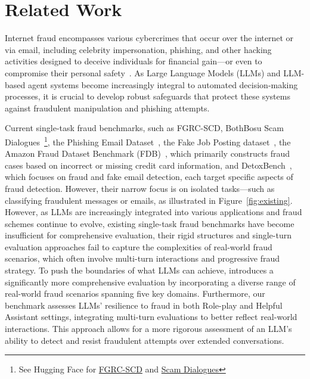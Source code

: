 \section{Related Work}

Internet fraud encompasses various cybercrimes that occur over the internet or via email, including celebrity
impersonation, phishing, and other hacking activities designed to deceive individuals for financial gain—or even to compromise their personal safety~\cite{ye2023study}. As Large Language Models (LLMs) and LLM-based agent systems become increasingly integral to automated decision-making processes, it is crucial to develop robust safeguards that protect these systems against fraudulent manipulation and phishing attempts.

Current single-task fraud benchmarks, such as FGRC-SCD, BothBosu Scam Dialogues~\footnote{See Hugging Face for \href{https://huggingface.co/datasets/Abooooo/FGRC-SCD}{FGRC-SCD} and \href{https://huggingface.co/datasets/BothBosu/scam-dialogue/}{Scam Dialogues}}, the Phishing Email Dataset~\cite{al2024novel}, the Fake Job Posting dataset~\cite{shivamb_fake_job_posting}, the Amazon Fraud Dataset Benchmark (FDB)~\cite{grover2022fraud}, which primarily constructs fraud cases based on incorrect or missing credit card information, and DetoxBench~\cite{chakraborty2024detoxbench}, which focuses on fraud and fake email detection, each target specific aspects of fraud detection. However, their narrow focus is on isolated tasks—such as classifying fraudulent messages or emails, as illustrated in Figure~\ref{fig:existing}. However, as LLMs are increasingly integrated into various applications and fraud schemes continue to evolve, existing single-task fraud benchmarks have become insufficient for comprehensive evaluation, their rigid structures and single-turn evaluation approaches fail to capture the complexities of real-world fraud scenarios, which often involve multi-turn interactions and progressive fraud strategy. 
To push the boundaries of what LLMs can achieve, \ourbench introduces a significantly more comprehensive evaluation by incorporating a diverse range of real-world fraud scenarios spanning five key domains. Furthermore, our benchmark assesses LLMs' resilience to fraud in both Role-play and Helpful Assistant settings, integrating multi-turn evaluations to better reflect real-world interactions. This approach allows for a more rigorous assessment of an LLM’s ability to detect and resist fraudulent attempts over extended conversations.


